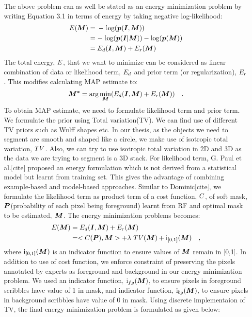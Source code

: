 The above problem can as well be stated as an energy minimization problem by
writing Equation 3.1 in terms of energy by taking negative log-likelihood:
\begin{align*}
\mathop{{}E}(\boldsymbol{M}) &=\, - \, \log(\boldsymbol{p}(\boldsymbol{I}, \boldsymbol{M})) \\
&= -\, \log(\boldsymbol{p}(\boldsymbol{I}|\boldsymbol{M})) - \log(\boldsymbol{p}(\boldsymbol{M})) \\
&= \mathop{{}E_d}(\boldsymbol{I}, \boldsymbol{M}) + \mathop{{}E_r} (\boldsymbol{M})
\end{align*}
The total energy, $\mathop{{}E}$, that we want to minimize can be considered as linear combination of data or likelihood term, $\mathop{{}E_d}$ and prior term (or regularization), $\mathop{{}E_r}$. This modifies calculating MAP estimate to:
\begin{equation*}
\boldsymbol{M^*} = \arg\min_{\boldsymbol{M}}({\mathop{{}E_d}(\boldsymbol{I}, \boldsymbol{M}) + \mathop{{}E_r} (\boldsymbol{M})}) \quad .
\end{equation*}
To obtain MAP estimate, we need to formulate likelihood term and prior term. We formulate the prior using Total variation(TV). We can find use of different TV priors such as Wulff shapes etc. In our thesis, as the objects we need to segment are smooth and shaped like a circle, we make use of isotropic total variation, $\mathop{{}TV}$. Also, we can try to use isotropic total variation in 2D and 3D as the data we are trying to segment is a 3D stack. For likelihood term, G. Paul et al.[cite] proposed an energy formulation which is not derived from a statistical model but learnt from training set. This gives the advantage of combining example-based and model-based approaches. Similar to Dominic[cite], we formulate the likelihood term as product term of a cost function, $\mathop{{}C}$, of soft mask, $\boldsymbol{P}$(probability of each pixel being foreground) learnt from RF and optimal mask to be estimated, $\boldsymbol{M}$. The energy minimization problems becomes:
\begin{align*}
\mathop{{}E}(\boldsymbol{M}) &= \mathop{{}E_d}(\boldsymbol{I}, \boldsymbol{M}) + \mathop{{}E_r} (\boldsymbol{M}) \\
&= <\mathop{{}C}(\boldsymbol{P}), \boldsymbol{M}> + \lambda\, \mathop{{}TV}(\boldsymbol{M}) + \mathrm{i}_{[0,1]}(\boldsymbol{M}) \quad , 
\end{align*}
where $\mathrm{i}_{[0,1]}(\boldsymbol{M})$ is an indicator function to ensure values of $\boldsymbol{M}$ remain in [0,1]. In addition to use of cost function, we enforce constraint of preserving the pixels annotated by experts as foreground and background in our energy minimization problem. We used an indicator function, $\mathrm{i}_{fg}(\boldsymbol{M})$, to ensure pixels in foreground scribbles have value of 1 in mask, and indicator function, $\mathrm{i}_{bg}(\boldsymbol{M})$, to ensure pixels in background scribbles have value of 0 in mask. Using discrete implementaion of TV, the final energy minimization problem is formulated as given below:
